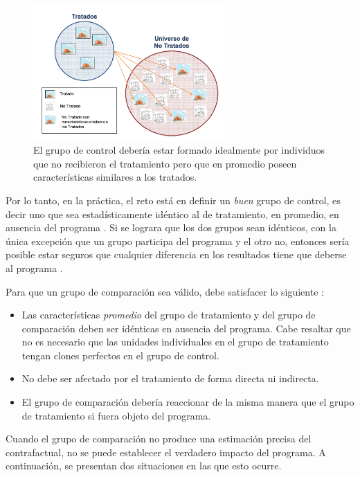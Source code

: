 \documentclass[../../main.tex]{subfiles}
\begin{document}
\begin{figure}[h!]
    \centering
    \includegraphics[width=0.65\textwidth]{figs/grupo-de-control.png}
    \caption{El grupo de control debería estar formado idealmente por individuos que no recibieron el tratamiento pero que en promedio poseen características similares a los tratados.}
    \label{fig:control-group}
\end{figure}

Por lo tanto, en la práctica, el reto está en definir un \textit{buen} grupo de control, es decir uno que sea estadísticamente idéntico al de tratamiento, en promedio, en ausencia del programa \cite{gertler-2016}. Si se lograra que los dos grupos sean idénticos, con la única excepción que un grupo participa del programa y el otro no, entonces sería posible estar seguros que cualquier diferencia en los resultados tiene que deberse al programa \cite{gertler-2016}.

Para que un grupo de comparación sea válido, debe satisfacer lo siguiente \cite{gertler-2016}:
\begin{itemize}
    \item Las características \textit{promedio} del grupo de tratamiento y del grupo de comparación deben ser idénticas en ausencia del programa. Cabe resaltar que no es necesario que las unidades individuales en el grupo de tratamiento tengan clones perfectos en el grupo de control.
    \item No debe ser afectado por el tratamiento de forma directa ni indirecta.
    \item El grupo de comparación debería reaccionar de la misma manera que el grupo de tratamiento si fuera objeto del programa.
\end{itemize}

Cuando el grupo de comparación no produce una estimación precisa del contrafactual, no se puede establecer el verdadero impacto del programa. A continuación, se presentan dos situaciones en las que esto ocurre.
\end{document}
